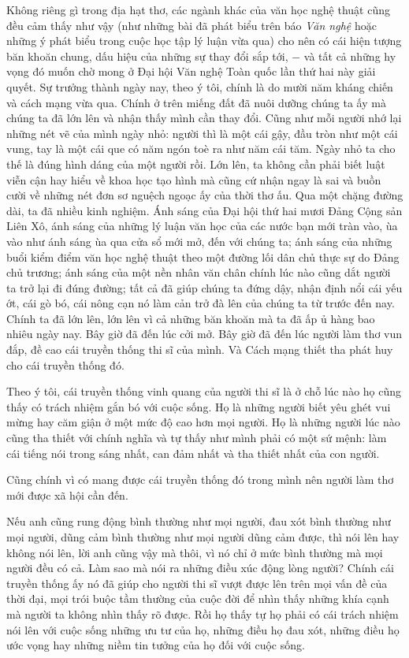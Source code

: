 \documentclass[../main.tex]{subfiles}
\begin{document}
\begin{multicols}{2}
Không riêng gì trong địa hạt thơ, các ngành khác của văn học nghệ thuật cũng đều cảm thấy như vậy (như những bài đã phát biểu trên báo \textit{Văn nghệ} hoặc những ý phát biểu trong cuộc học tập lý luận vừa qua) cho nên có cái hiện tượng băn khoăn chung, dấu hiệu của những sự thay đổi sắp tới, − và tất cả những hy vọng đó muốn chờ mong ở Đại hội Văn nghệ Toàn quốc lần thứ hai này giải quyết. Sự trưởng thành ngày nay, theo ý tôi, chính là do mười năm kháng chiến và cách mạng vừa qua. Chính ở trên miếng đất đã nuôi dưỡng chúng ta ấy mà chúng ta đã lớn lên và nhận thấy mình cần thay đổi. Cũng như mỗi người nhớ lại những nét vẽ của mình ngày nhỏ: người thì là một cái gậy, đầu tròn như một cái vung, tay là một cái que có năm ngón toè ra như năm cái tăm. Ngày nhỏ ta cho thế là đúng hình dáng của một người rồi. Lớn lên, ta không cần phải biết luật viễn cận hay hiểu về khoa học tạo hình mà cũng cứ nhận ngay là sai và buồn cười về những nét đơn sơ nguệch ngoạc ấy của thời thơ ấu. Qua một chặng đường dài, ta đã nhiều kinh nghiệm. Ánh sáng của Đại hội thứ hai mươi Đảng Cộng sản Liên Xô, ánh sáng của những lý luận văn học của các nước bạn mới tràn vào, ùa vào như ánh sáng ùa qua cửa sổ mới mở, đến với chúng ta; ánh sáng của những buổi kiểm điểm văn học nghệ thuật theo một đường lối dân chủ thực sự do Đảng chủ trương; ánh sáng của một nền nhân văn chân chính lúc nào cũng dắt người ta trở lại đi đúng đường; tất cả đã giúp chúng ta đứng dậy, nhận định nổi cái yếu ớt, cái gò bó, cái nông cạn nó làm cản trở đà lên của chúng ta từ trước đến nay. Chính ta đã lớn lên, lớn lên vì cả những băn khoăn mà ta đã ấp ủ hàng bao nhiêu ngày nay. Bây giờ đã đến lúc cởi mở. Bây giờ đã đến lúc người làm thơ vun đắp, đề cao cái truyền thống thi sĩ của mình. Và Cách mạng thiết tha phát huy cho cái truyền thống đó. 
 
Theo ý tôi, cái truyền thống vinh quang của người thi sĩ là ở chỗ lúc nào họ cũng thấy có trách nhiệm gắn bó với cuộc sống. Họ là những người biết yêu ghét vui mừng hay căm giận ở một mức độ cao hơn mọi người. Họ là những người lúc nào cũng tha thiết với chính nghĩa và tự thấy như mình phải có một sứ mệnh: làm cái tiếng nói trong sáng nhất, can đảm nhất và tha thiết nhất của con người. 
 
Cũng chính vì có mang được cái truyền thống đó trong mình nên người làm thơ mới được xã hội cần đến.  
 
Nếu anh cũng rung động bình thường như mọi người, đau xót bình thường như mọi người, dũng cảm bình thường như mọi người dũng cảm được, thì nói lên hay không nói lên, lời anh cũng vậy mà thôi, vì nó chỉ ở mức bình thường mà mọi người đều có cả. Làm sao mà nói ra những điều xúc động lòng người? Chính cái truyền thống ấy nó đã giúp cho người thi sĩ vượt được lên trên mọi vấn đề của thời đại, mọi trói buộc tầm thường của cuộc đời để nhìn thấy những khía cạnh mà người ta không nhìn thấy rõ được. Rồi họ thấy tự họ phải có cái trách nhiệm nói lên với cuộc sống những ưu tư của họ, những điều họ đau xót, những điều họ ước vọng hay những niềm tin tưởng của họ đối với cuộc sống.  
 

\end{multicols}
\end{document}
